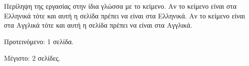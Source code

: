 \chapter*{\abstractname}
\addstarredchapter{\abstractname} %
\makecseabstract


\noindent Περίληψη της εργασίας στην ίδια γλώσσα με το κείμενο.
Αν το κείμενο είναι στα Ελληνικά τότε και αυτή η σελίδα πρέπει να είναι στα Ελληνικά.
Αν το κείμενο είναι στα Αγγλικά τότε και αυτή η σελίδα πρέπει να είναι στα Αγγλικά.

\bigskip

\noindent Προτεινόμενο: 1 σελίδα.

\noindent Μέγιστο: 2 σελίδες.